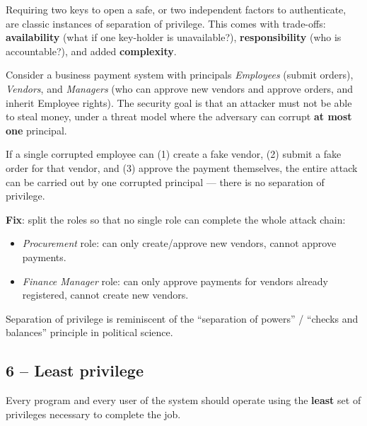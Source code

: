 \begin{example}
Requiring two keys to open a safe, or two independent factors to authenticate, are classic instances of separation of privilege. This comes with trade-offs: \textbf{availability} (what if one key-holder is unavailable?), \textbf{responsibility} (who is accountable?), and added \textbf{complexity}.
\end{example}

\begin{example}
Consider a business payment system with principals \emph{Employees} (submit orders), \emph{Vendors}, and \emph{Managers} (who can approve new vendors and approve orders, and inherit Employee rights). The security goal is that an attacker must not be able to steal money, under a threat model where the adversary can corrupt \textbf{at most one} principal.

If a single corrupted employee can (1) create a fake vendor, (2) submit a fake order for that vendor, and (3) approve the payment themselves, the entire attack can be carried out by one corrupted principal --- there is no separation of privilege.

\textbf{Fix}: split the roles so that no single role can complete the whole attack chain:
\begin{itemize}
    \item \emph{Procurement} role: can only create/approve new vendors, cannot approve payments.
    \item \emph{Finance Manager} role: can only approve payments for vendors already registered, cannot create new vendors.
\end{itemize}
\end{example}

\begin{remark}
Separation of privilege is reminiscent of the ``separation of powers'' / ``checks and balances'' principle in political science.
\end{remark}

\subsection{6 -- Least privilege}

\begin{definition}
Every program and every user of the system should operate using the \textbf{least} set of privileges necessary to complete the job.
\end{definition}

